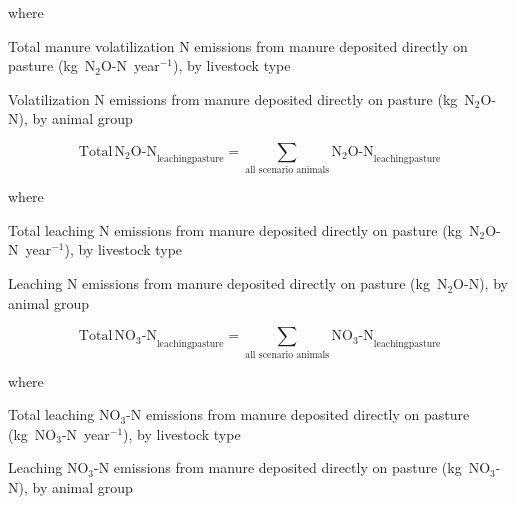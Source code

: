 \noindent where

\begin{description}[font=\normalfont, leftmargin=12em, style=nextline, nosep]
    \item[$\mathrm{Total\,N_2O\text{-}N}_{\mathrm{volatilizationpasture}}$]
        Total manure volatilization N emissions from manure deposited directly
        on pasture (kg~N$_2$O-N~year$^{-1}$), by livestock type
    \item[$\mathrm{N_2O\text{-}N}_{\mathrm{volatilizationpasture}}$]
        Volatilization N emissions from manure deposited directly on pasture
        (kg~N$_2$O-N), by animal group
\end{description}

\begin{equation}
    \mathrm{Total\,N_2O\text{-}N}_{\mathrm{leachingpasture}}
        = \sum_{\text{all scenario animals}}
          \mathrm{N_2O\text{-}N}_{\mathrm{leachingpasture}}
    \tag{Eq.\ 5.5.2-4}
\end{equation}

\noindent where

\begin{description}[font=\normalfont, leftmargin=12em, style=nextline, nosep]
    \item[$\mathrm{Total\,N_2O\text{-}N}_{\mathrm{leachingpasture}}$]
        Total leaching N emissions from manure deposited directly on pasture
        (kg~N$_2$O-N~year$^{-1}$), by livestock type
    \item[$\mathrm{N_2O\text{-}N}_{\mathrm{leachingpasture}}$]
        Leaching N emissions from manure deposited directly on pasture
        (kg~N$_2$O-N), by animal group
\end{description}

\begin{equation}
    \mathrm{Total\,NO_3\text{-}N}_{\mathrm{leachingpasture}}
        = \sum_{\text{all scenario animals}}
          \mathrm{NO_3\text{-}N}_{\mathrm{leachingpasture}}
    \tag{Eq.\ 5.5.2-5}
\end{equation}

\noindent where

\begin{description}[font=\normalfont, leftmargin=12em, style=nextline, nosep]
    \item[$\mathrm{Total\,NO_3\text{-}N}_{\mathrm{leachingpasture}}$]
        Total leaching NO$_3$-N emissions from manure deposited directly on
        pasture (kg~NO$_3$-N~year$^{-1}$), by livestock type
    \item[$\mathrm{NO_3\text{-}N}_{\mathrm{leachingpasture}}$]
        Leaching NO$_3$-N emissions from manure deposited directly on pasture
        (kg~NO$_3$-N), by animal group
\end{description}

